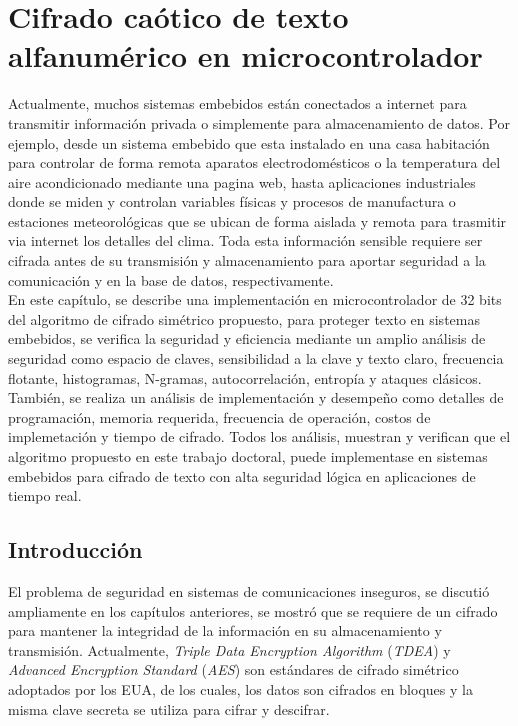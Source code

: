 
\chapter{Cifrado caótico de texto alfanumérico en microcontrolador}
Actualmente, muchos sistemas embebidos están conectados a internet para transmitir información privada o simplemente para almacenamiento de datos. Por ejemplo, desde un sistema embebido que esta instalado en una casa habitación para controlar de forma remota aparatos electrodomésticos o la temperatura del aire acondicionado mediante una pagina web, hasta aplicaciones industriales donde se miden y controlan variables físicas y procesos de manufactura o estaciones meteorológicas que se ubican de forma aislada y remota para trasmitir via internet los detalles del clima. Toda esta información sensible requiere ser cifrada antes de su transmisión y almacenamiento para aportar seguridad a la comunicación y en la base de datos, respectivamente. \\

En este capítulo, se describe una implementación en microcontrolador de 32 bits del algoritmo de cifrado simétrico propuesto, para proteger texto en sistemas embebidos, se verifica la seguridad y eficiencia mediante un amplio análisis de seguridad como espacio de claves, sensibilidad a la clave y texto claro, frecuencia flotante, histogramas, N-gramas, autocorrelación, entropía y ataques clásicos. También, se realiza un análisis de implementación y desempeño como detalles de programación, memoria requerida, frecuencia de operación, costos de implemetación y tiempo de cifrado. Todos los análisis, muestran y verifican que el algoritmo propuesto en este trabajo doctoral, puede implementase en sistemas embebidos para cifrado de texto con alta seguridad lógica en aplicaciones de tiempo real. 

\section{Introducción}
El problema de seguridad en sistemas de comunicaciones inseguros, se discutió ampliamente en los capítulos anteriores, se mostró que se requiere de un cifrado para mantener la integridad de la información en su almacenamiento y transmisión. Actualmente, \textit{Triple Data Encryption Algorithm} (\textit{TDEA}) y \textit{Advanced Encryption Standard} (\textit{AES}) son estándares de cifrado simétrico adoptados por los EUA, de los cuales, los datos son cifrados en bloques y la misma clave secreta se utiliza para cifrar y descifrar.  \\ 


